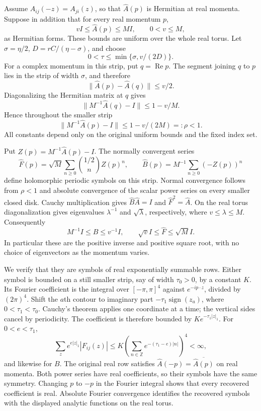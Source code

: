 Assume $A_{ij}(-z)=A_{ji}(z)$, so that $\widehat A(p)$ is Hermitian
at real momenta. Suppose in addition that for every real momentum $p$,
\begin{equation}\label{eq:positive-symbol-band}
                 vI\le\widehat A(p)\le MI,
                              \qquad 0<v\le M,
\end{equation}
as Hermitian forms. These bounds are uniform over the whole
real torus. Let $\sigma=\eta/2$, $D=rC/(\eta-\sigma)$,
and choose
\[
       0<\tau\le\min\{\sigma,v/(2D)\}.
\]
For a complex momentum in this strip, put $q=\operatorname{Re}p$.
The segment joining $q$ to $p$ lies in the strip of width $\sigma$,
and therefore
\[
                   \|\widehat A(p)-\widehat A(q)\|\le v/2.
\]
Diagonalizing the Hermitian matrix at $q$ gives
\[
 \|M^{-1}\widehat A(q)-I\|\le1-v/M.
\]
Hence throughout the smaller strip
\begin{equation}\label{eq:positive-binomial-disk}
      \|M^{-1}\widehat A(p)-I\|\le1-v/(2M)=:\rho<1.
\end{equation}
All constants depend only on the original uniform bounds and the
fixed index set.

Put $Z(p)=M^{-1}\widehat A(p)-I$. The normally convergent series
\[
 \widehat F(p)=\sqrt M\sum_{n\ge0}{1/2\choose n}Z(p)^n,
 \qquad
 \widehat B(p)=M^{-1}\sum_{n\ge0}(-Z(p))^n
\]
define holomorphic periodic symbols on this strip. Normal convergence
follows from $\rho<1$ and absolute convergence of the scalar power
series on every smaller closed disk. Cauchy multiplication gives
$\widehat B\widehat A=I$ and $\widehat F^2=\widehat A$.
On the real torus diagonalization gives eigenvalues
$\lambda^{-1}$ and $\sqrt\lambda$, respectively, where
$v\le\lambda\le M$. Consequently
\begin{equation}\label{eq:positive-root-bands}
 M^{-1}I\le\widehat B\le v^{-1}I,
 \qquad \sqrt v I\le\widehat F\le\sqrt M I.
\end{equation}
In particular these are the positive inverse and positive square root,
with no choice of eigenvectors as the momentum varies.

We verify that they are symbols of real exponentially summable rows.
Either symbol is bounded on a still smaller strip, say of width
$\tau_0>0$, by a constant $K$. Its Fourier coefficient is the
integral over $[-\pi,\pi]^4$ against $e^{-ip\cdot z}$, divided
by $(2\pi)^4$. Shift the $a$th contour to imaginary part
$-\tau_1\operatorname{sign}(z_a)$, where $0<\tau_1<\tau_0$.
Cauchy's theorem applies one coordinate at a time; the vertical
sides cancel by periodicity. The coefficient is therefore bounded
by $Ke^{-\tau_1|z|_1}$. For $0<e<\tau_1$,
\[
 \sum_z e^{e|z|_1}|F_{ij}(z)|
 \le K\left(\sum_{n\in\mathbb Z}
                      e^{-(\tau_1-e)|n|}\right)^4<\infty,
\]
and likewise for $B$. The original real row satisfies
$\widehat A(-p)=\overline{\widehat A(p)}$ on real momenta.
Both power series have real coefficients, so their symbols have
the same symmetry. Changing $p$ to $-p$ in the Fourier integral
shows that every recovered coefficient is real.
Absolute Fourier convergence identifies the recovered symbols with
the displayed analytic functions on the real torus.

